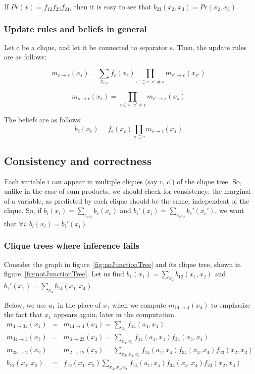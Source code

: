 \documentclass[12pt]{report}
\begin{document}
If $Pr(x) = f_{12}f_{23}f_{24}$, then it is easy to see that $b_{23}(x_2, x_3) = Pr(x_2, x_3)$.

\subsubsection{Update rules and beliefs in general}
Let c be a clique, and let it be connected to separator s. Then, the update rules are as follows:

$$m_{c \to s}(x_s) = \sum_{x_{c \setminus s}} f_c(x_c) \prod_{s' \subset c,\ s' \neq s}m_{s' \to c}(x_{s'})$$

$$m_{s \to c}(x_s) = \prod_{s \subset c,\ c' \neq c}m_{c' \to s}(x_{s})$$

The beliefs are as follows:
$$b_{c}(x_c) = f_{c}(x_c)\prod_{s \subset c}m_{s \to c}(x_s)$$


\subsection{Consistency and correctness}
Each variable i can appear in multiple cliques (say c, c') of the clique tree. So, unlike in the case of sum products, we should check for consistency: the marginal of a variable, as predicted by each clique should be the same, independent of the clique. So, if $b_i(x_i) = \sum_{x_{c \setminus i}}b_c(x_c)$ and $b_i'(x_i) = \sum_{x_{c' \setminus i}}b_c'(x_c')$, we want that $\forall i: b_i(x_i) = b_i'(x_i)$.

\subsubsection{Clique trees where inference fails}
Consider the graph in figure~\ref{fig:noJunctionTree} and its clique tree, shown in figure~\ref{fig:notJunctionTree}. Let us find $b_1(x_1) = \sum_{x_2}b_{12}(x_1, x_2)$ and $b_1'(x_1) = \sum_{x_4}b_{14}(x_1, x_4)$.

Below, we use $a_1$ in the place of $x_1$ when we compute $m_{14 \to 4}(x_4)$ to emphasize the fact that $x_1$ appears again, later in the computation.
\begin{eqnarray*}
m_{4 \to 34}(x_4) &=& m_{14 \to 4}(x_4) = \sum_{a_1}f_{14}(a_1, x_4)\\
m_{34 \to 3}(x_3) &=& m_{3 \to 23}(x_3) = \sum_{x_4,a_1}f_{14}(a_1, x_4)f_{34}(x_3, x_4)\\
m_{23 \to 2}(x_2) &=& m_{2 \to 12}(x_2) = \sum_{x_3, x_4,a_1}f_{14}(a_1, x_4)f_{34}(x_3, x_4)f_{23}(x_2, x_3)\\
b_{12}(x_1, x_2) &=& f_{12}(x_1, x_2)\sum_{x_3, x_4,a_1}f_{14}(a_1, x_4)f_{34}(x_3, x_4)f_{23}(x_2, x_3)\\
\end{eqnarray*}
\end{document}
